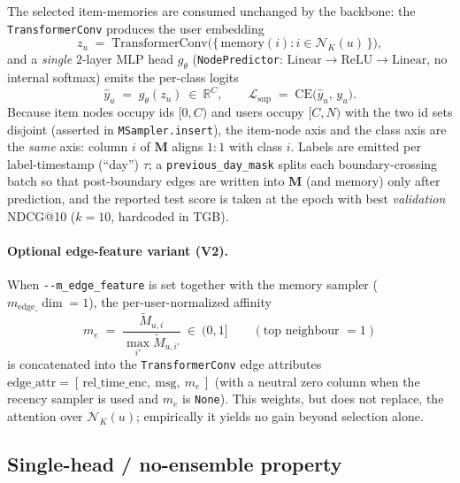 \documentclass[11pt]{article}
\begin{document}
The selected item-memories are consumed unchanged by the backbone: the \texttt{TransformerConv} produces the user embedding
\begin{equation}
z_u \;=\; \mathrm{TransformerConv}\!\big(\{\, \text{memory}(i) : i\in\mathcal{N}_K(u) \,\}\big),
\end{equation}
and a \emph{single} $2$-layer MLP head $g_\theta$ (\texttt{NodePredictor}: $\mathrm{Linear}\!\rightarrow\!\mathrm{ReLU}\!\rightarrow\!\mathrm{Linear}$, no internal softmax) emits the per-class logits
\begin{equation}
\hat y_u \;=\; g_\theta(z_u)\ \in\ \mathbb{R}^{C},
\qquad
\mathcal{L}_{\text{sup}} \;=\; \mathrm{CE}\big(\hat y_u,\, y_u\big).
\end{equation}
Because item nodes occupy ids $[0,C)$ and users occupy $[C,N)$ with the two id sets disjoint (asserted in \texttt{MSampler.insert}), the item-node axis and the class axis are the \emph{same} axis: column $i$ of $\mathbf{M}$ aligns $1{:}1$ with class $i$. Labels are emitted per label-timestamp (``day'') $\tau$; a \texttt{previous\_day\_mask} splits each boundary-crossing batch so that post-boundary edges are written into $\mathbf{M}$ (and memory) only after prediction, and the reported test score is taken at the epoch with best \emph{validation} NDCG@10 ($k=10$, hardcoded in TGB).

\paragraph{Optional edge-feature variant (V2).}
When \texttt{-{}-m\_edge\_feature} is set together with the memory sampler ($m_{\text{edge}\_}\dim=1$), the per-user-normalized affinity
\begin{equation}
m_e \;=\; \frac{\tilde M_{u,i}}{\max_{i'} \tilde M_{u,i'}}\ \in\ (0,1]
\qquad(\text{top neighbour }=1)
\end{equation}
is concatenated into the \texttt{TransformerConv} edge attributes $\text{edge\_attr}=[\,\text{rel\_time\_enc},\ \text{msg},\ m_e\,]$ (with a neutral zero column when the recency sampler is used and $m_e$ is \texttt{None}). This weights, but does not replace, the attention over $\mathcal{N}_K(u)$; empirically it yields no gain beyond selection alone.

\subsection{Single-head / no-ensemble property}
\end{document}
